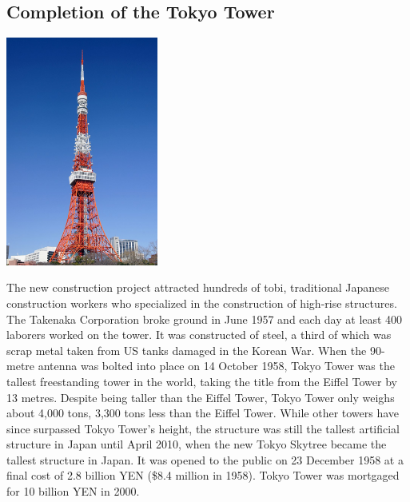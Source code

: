 \documentclass[11pt]{report}
\begin{document}
\subsection{Completion of the Tokyo Tower}
\vspace{2mm}\begin{center}\includegraphics[width=5cm]{./img/tokyoTower.jpg}\end{center}

The new construction project attracted hundreds of tobi, traditional Japanese construction workers who specialized in the construction of high-rise structures. The Takenaka Corporation broke ground in June 1957 and each day at least 400 laborers worked on the tower. It was constructed of steel, a third of which was scrap metal taken from US tanks damaged in the Korean War. When the 90-metre antenna was bolted into place on 14 October 1958, Tokyo Tower was the tallest freestanding tower in the world, taking the title from the Eiffel Tower by 13 metres. Despite being taller than the Eiffel Tower, Tokyo Tower only weighs about 4,000 tons, 3,300 tons less than the Eiffel Tower. While other towers have since surpassed Tokyo Tower's height, the structure was still the tallest artificial structure in Japan until April 2010, when the new Tokyo Skytree became the tallest structure in Japan. It was opened to the public on 23 December 1958 at a final cost of 2.8 billion YEN (\$8.4 million in 1958). Tokyo Tower was mortgaged for 10 billion YEN in 2000.
\end{document}
